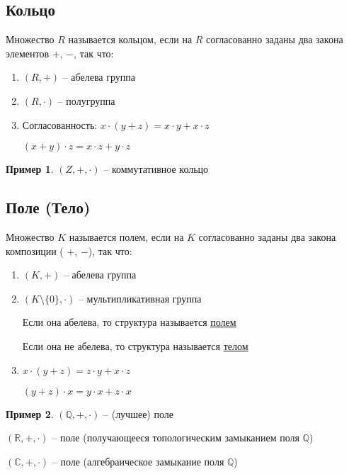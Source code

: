\documentclass{book}
\newcommand\R{\ensuremath{\mathbb{R}}}
\newcommand\Q{\ensuremath{\mathbb{Q}}}
\renewcommand\C{\ensuremath{\mathbb{C}}}
\theoremstyle{definition}
\newtheorem*{example}{Пример}
\begin{document}
\subsection{Кольцо}

\begin{definition}
    Множество $R$ называется кольцом, если на  $R$ согласованно заданы два закона элементов  $+$,  $-$, так что:
     \begin{enumerate}
         \item $(R, +)$ -- абелева группа
         \item  $(R, \cdot )$ -- полугруппа
         \item Согласованность:  $x\cdot (y+z) = x\cdot y + x\cdot z$

             $(x+y)\cdot z = x\cdot z + y\cdot z$
    \end{enumerate}
\end{definition}
\begin{example}
    $(Z, +, \cdot )$ -- коммутативное кольцо
\end{example}
\subsection{Поле (Тело)}
\begin{definition}
    Множество $K$ называется полем, если на  $K$ согласованно заданы два закона композиции ( $+$,  $-$), так что:
     \begin{enumerate}
         \item $(K, +)$ -- абелева группа
         \item  $(K\setminus \{0\}, \cdot )$ -- мультипликативная группа 

             Если она абелева, то структура называется \underline{полем}

             Если она не абелева, то структура называется \underline{телом}
         \item $x\cdot (y+z) = z\cdot y + x\cdot z$

             $(y+z)\cdot x = y\cdot x + z\cdot x$
     \end{enumerate}
\end{definition}

\begin{example}
    $(\Q, +, \cdot )$ -- (лучшее) поле

    $(\R, +, \cdot )$ -- поле (получающееся топологическим замыканием поля $\Q$)

    $(\C, +, \cdot )$ -- поле (алгебраическое замыкание поля $\Q$)
\end{example}
\end{document}
